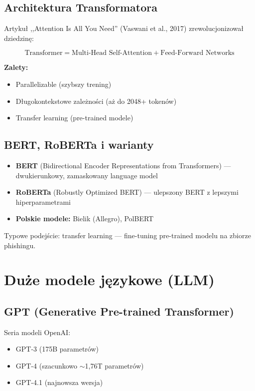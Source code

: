 \documentclass[11pt]{extreport}
\begin{document}
\subsection{Architektura Transformatora}

Artykuł ,,Attention Is All You Need'' (Vaswani et al., 2017) \cite{vaswani2017attention} zrewolucjonizował dziedzinę:

\begin{equation}
\text{Transformer} = \text{Multi-Head Self-Attention} + \text{Feed-Forward Networks}
\end{equation}

\textbf{Zalety:}
\begin{itemize}
    \item Parallelizable (szybszy trening)
    \item Długokontekstowe zależności (aż do 2048+ tokenów)
    \item Transfer learning (pre-trained modele)
\end{itemize}

\subsection{BERT, RoBERTa i warianty}

\begin{itemize}
    \item \textbf{BERT} (Bidirectional Encoder Representations from Transformers) --- dwukierunkowy, zamaskowany language model \cite{devlin2018bert}
    \item \textbf{RoBERTa} (Robustly Optimized BERT) --- ulepszony BERT z lepszymi hiperparametrami
    \item \textbf{Polskie modele:} Bielik (Allegro), PolBERT
\end{itemize}

Typowe podejście: transfer learning --- fine-tuning pre-trained modelu na zbiorze phishingu.

\section{Duże modele językowe (LLM)}
\label{sec:llm}

\subsection{GPT (Generative Pre-trained Transformer)}

Seria modeli OpenAI:
\begin{itemize}
    \item GPT-3 (175B parametrów)
    \item GPT-4 (szacunkowo $\sim$1,76T parametrów)
    \item GPT-4.1 (najnowsza wersja)
\end{itemize}
\end{document}
